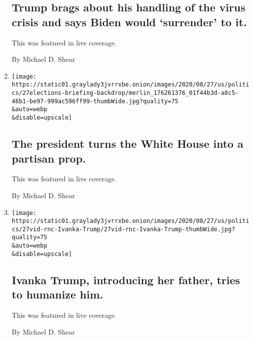 \begin{enumerate}
  \hypertarget{trump-brags-about-his-handling-of-the-virus-crisis-and-says-biden-would-surrender-to-it}{%
  \subsection{Trump brags about his handling of the virus crisis and
  says Biden would `surrender' to
  it.}\label{trump-brags-about-his-handling-of-the-virus-crisis-and-says-biden-would-surrender-to-it}}

  This was featured in live coverage.

  By Michael D. Shear
\item
  \href{/live/2020/08/27/us/rnc-convention-election/the-president-turns-the-white-house-into-a-partisan-prop}{}

  \texttt{[image: https://static01.graylady3jvrrxbe.onion/images/2020/08/27/us/politics/27elections-briefing-backdrop/merlin\_176261376\_01f44b3d-a8c5-46b1-be97-999ac596ff99-thumbWide.jpg?quality=75\\\&auto=webp\\\&disable=upscale]}

  \hypertarget{the-president-turns-the-white-house-into-a-partisan-prop}{%
  \subsection{The president turns the White House into a partisan
  prop.}\label{the-president-turns-the-white-house-into-a-partisan-prop}}

  This was featured in live coverage.

  By Michael D. Shear
\item
  \href{/live/2020/08/27/us/rnc-convention-election/ivanka-trump-introducing-her-father-tries-to-humanize-him}{}

  \texttt{[image: https://static01.graylady3jvrrxbe.onion/images/2020/08/27/us/politics/27vid-rnc-Ivanka-Trump/27vid-rnc-Ivanka-Trump-thumbWide.jpg?quality=75\\\&auto=webp\\\&disable=upscale]}

  \hypertarget{ivanka-trump-introducing-her-father-tries-to-humanize-him}{%
  \subsection{Ivanka Trump, introducing her father, tries to humanize
  him.}\label{ivanka-trump-introducing-her-father-tries-to-humanize-him}}

  This was featured in live coverage.

  By Michael D. Shear
\end{enumerate}

